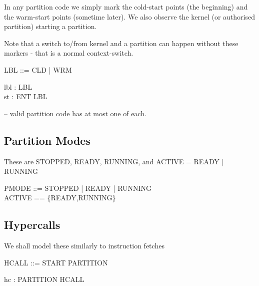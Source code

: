 In any partition code we simply mark the cold-start points (the beginning)
and the warm-start points (sometime later).
We also observe the kernel (or authorised partition) starting a partition.

Note that a switch to/from kernel and a partition can happen without these
markers - that is a normal context-switch.

\begin{circus}

LBL  %
  ::= CLD   %
  | WRM   %
\end{circus}

\begin{circus}
\circchannel lbl : LBL\\
\circchannel st : ENT \cross LBL  %
\end{circus}
-- valid partition code has at most one of each.

\subsection{Partition Modes} %
  These are STOPPED, READY, RUNNING, and ACTIVE = READY | RUNNING

\begin{circus}
PMODE ::= STOPPED | READY | RUNNING\\
ACTIVE == \{READY,RUNNING\} %
\end{circus}

\subsection{Hypercalls } %
   We shall model these similarly to instruction fetches

\begin{circus}
HCALL ::= START \ldata PARTITION \rdata %
\end{circus}
\begin{circus}
\circchannel hc : PARTITION \cross HCALL  %
\end{circus}

